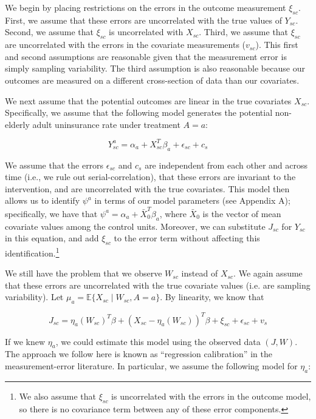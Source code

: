 \documentclass[aoas]{imsart}
\theoremstyle{plain}
\theoremstyle{remark}
\begin{document}
We begin by placing restrictions on the errors in the outcome measurement $\xi_{sc}$. First, we assume that these errors are uncorrelated with the true values of $Y_{sc}$. Second, we assume that $\xi_{sc}$ is uncorrelated with $X_{sc}$. Third, we assume that $\xi_{sc}$ are uncorrelated with the errors in the covariate measurements ($v_{sc}$). This first and second assumptions are reasonable given that the measurement error is simply sampling variability. The third assumption is also reasonable because our outcomes are measured on a different cross-section of data than our covariates. 

We next assume that the potential outcomes are linear in the true covariates $X_{sc}$. Specifically, we assume that the following model generates the potential non-elderly adult uninsurance rate under treatment $A = a$:

\begin{equation}
Y_{sc}^a = \alpha_a + X_{sc}^T\beta_a + \epsilon_{sc} + c_s
\end{equation}

We assume that the errors $\epsilon_{sc}$ and $c_s$ are independent from each other and across time (i.e., we rule out serial-correlation), that these errors are invariant to the intervention, and are uncorrelated with the true covariates. This model then allows us to identify $\psi^a$ in terms of our model parameters (see Appendix A); specifically, we have that $\psi^a = \alpha_a + \bar{X}_0^T\beta_a$, where $\bar{X}_0$ is the vector of mean covariate values among the control units. Moreover, we can substitute $J_{sc}$ for $Y_{sc}$ in this equation, and add $\xi_{sc}$ to the error term without affecting this identification.\footnote{We also assume that $\xi_{sc}$ is uncorrelated with the errors in the outcome model, so there is no covariance term between any of these error components.} 

We still have the problem that we observe $W_{sc}$ instead of $X_{sc}$. We again assume that these errors are uncorrelated with the true covariate values (i.e. are sampling variability). Let $\mu_a = \mathbb{E}\{X_{sc} \mid W_{sc}, A = a\}$. By linearity, we know that

\begin{equation}
    J_{sc} = \eta_a(W_{sc})^T\beta + (X_{sc} - \eta_a(W_{sc}))^T\beta + \xi_{sc} + \epsilon_{sc} + v_s 
\end{equation}

If we knew $\eta_a$, we could estimate this model using the observed data $(J, W)$. The approach we follow here is known as ``regression calibration'' in the measurement-error literature. In particular, we assume the following model for $\eta_a$:
\end{document}
